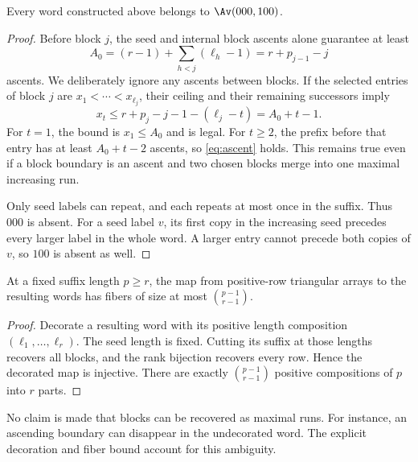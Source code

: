 \begin{lemma}\label{lem:legalpositive}
Every word constructed above belongs to $\Av(000,100)$.
\end{lemma}
\begin{proof}
Before block $j$, the seed and internal block ascents alone guarantee at least
\[
 A_0=(r-1)+\sum_{h<j}(\ell_h-1)=r+p_{j-1}-j
\]
ascents. We deliberately ignore any ascents between blocks. If the selected entries of block $j$ are $x_1<\cdots<x_{\ell_j}$, their ceiling and their remaining successors imply
\[
 x_t\le r+p_j-j-1-(\ell_j-t)=A_0+t-1.
\]
For $t=1$, the bound is $x_1\le A_0$ and is legal. For $t\ge2$, the prefix before that entry has at least $A_0+t-2$ ascents, so \eqref{eq:ascent} holds. This remains true even if a block boundary is an ascent and two chosen blocks merge into one maximal increasing run.

Only seed labels can repeat, and each repeats at most once in the suffix. Thus $000$ is absent. For a seed label $v$, its first copy in the increasing seed precedes every larger label in the whole word. A larger entry cannot precede both copies of $v$, so $100$ is absent as well.
\end{proof}

\begin{lemma}\label{lem:blockfiber}
At a fixed suffix length $p\ge r$, the map from positive-row triangular arrays to the resulting words has fibers of size at most $\binom{p-1}{r-1}$.
\end{lemma}
\begin{proof}
Decorate a resulting word with its positive length composition $(\ell_1,\ldots,\ell_r)$. The seed length is fixed. Cutting its suffix at those lengths recovers all blocks, and the rank bijection recovers every row. Hence the decorated map is injective. There are exactly $\binom{p-1}{r-1}$ positive compositions of $p$ into $r$ parts.
\end{proof}
No claim is made that blocks can be recovered as maximal runs. For instance, an ascending boundary can disappear in the undecorated word. The explicit decoration and fiber bound account for this ambiguity.
